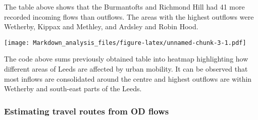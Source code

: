 \documentclass[]{article}
\newenvironment{Shaded}{\begin{snugshade}}{\end{snugshade}}
\newcommand{\CommentTok}[1]{\textcolor[rgb]{0.56,0.35,0.01}{\textit{#1}}}
\newcommand{\DataTypeTok}[1]{\textcolor[rgb]{0.13,0.29,0.53}{#1}}
\newcommand{\FloatTok}[1]{\textcolor[rgb]{0.00,0.00,0.81}{#1}}
\newcommand{\KeywordTok}[1]{\textcolor[rgb]{0.13,0.29,0.53}{\textbf{#1}}}
\newcommand{\NormalTok}[1]{#1}
\newcommand{\OperatorTok}[1]{\textcolor[rgb]{0.81,0.36,0.00}{\textbf{#1}}}
\newcommand{\OtherTok}[1]{\textcolor[rgb]{0.56,0.35,0.01}{#1}}
\newcommand{\StringTok}[1]{\textcolor[rgb]{0.31,0.60,0.02}{#1}}
\begin{document}
The table above shows that the Burmantofts and Richmond Hill had 41 more
recorded incoming flows than outflows. The areas with the highest
outflows were Wetherby, Kippax and Methley, and Ardsley and Robin Hood.

\begin{Shaded}
\end{Shaded}

\texttt{[image: Markdown\_analysis\_files/figure-latex/unnamed-chunk-3-1.pdf]}

The code above sums previously obtained table into heatmap highlighting
how different areas of Leeds are affected by urban mobility. It can be
observed that most inflows are consolidated around the centre and
highest outflows are within Wetherby and south-east parts of the Leeds.

\hypertarget{estimating-travel-routes-from-od-flows}{%
\subsubsection{Estimating travel routes from OD
flows}\label{estimating-travel-routes-from-od-flows}}
\end{document}
